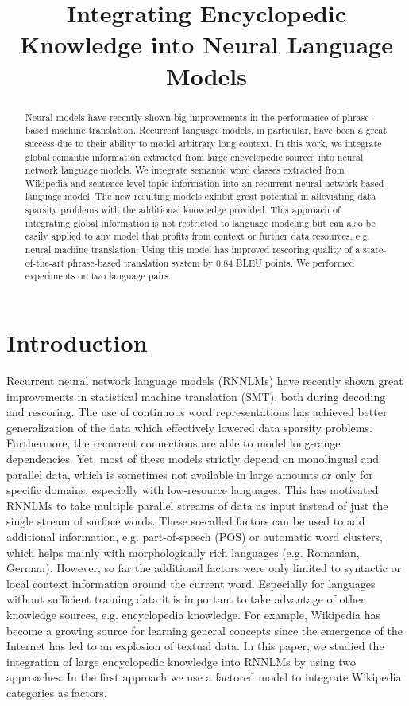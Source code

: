 \documentclass[a4paper]{article}
\title{Integrating Encyclopedic Knowledge into Neural Language Models}
\begin{document}
\maketitle
%
\begin{abstract}
Neural models have recently shown big improvements in the performance of phrase-based machine translation. Recurrent language models, in particular, have been a great success due to their ability to model arbitrary long context. In this work, we integrate global semantic information extracted from large encyclopedic sources into neural network language models. We integrate semantic word classes extracted from Wikipedia and sentence level topic information into an recurrent neural network-based language model.
The new resulting models exhibit great potential in alleviating data sparsity problems with the additional knowledge provided. This approach of integrating global information is not restricted to language modeling but can also be easily applied to any model that profits from context or further data resources, e.g. neural machine translation. Using this model has improved rescoring quality of a state-of-the-art phrase-based translation system by 0.84 BLEU points. We performed experiments on two language pairs.



\end{abstract}


%
\section{Introduction}
Recurrent neural network language models (RNNLMs) have recently shown great improvements in statistical machine translation (SMT), both during decoding and rescoring. The use of continuous word representations has achieved better generalization of the data which effectively lowered data sparsity problems. Furthermore, the recurrent connections are able to model long-range dependencies. Yet, most of these models strictly depend on monolingual and parallel data, which is sometimes not available in large amounts or only for specific domains, especially with low-resource languages.
This has motivated RNNLMs to take multiple parallel streams of data as input instead of just the single stream of surface words. These so-called factors can be used to add additional information, e.g. part-of-speech (POS) or automatic word clusters, which helps mainly with morphologically rich languages (e.g. Romanian, German). However, so far the additional factors were only limited to syntactic or local context information around the current word. Especially for languages without sufficient training data it is important to take advantage of other knowledge sources, e.g. encyclopedia knowledge. For example, Wikipedia has become a growing source for learning general concepts since the emergence of the Internet has led to an explosion of textual data. 
In this paper, we studied the integration of large encyclopedic knowledge into RNNLMs by using two approaches. 
In the first approach we use a factored model to integrate Wikipedia categories as factors. 
\end{document}
